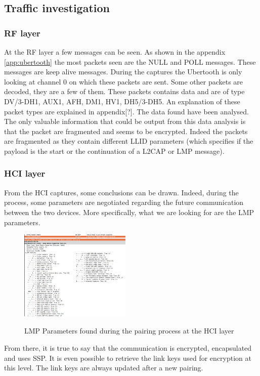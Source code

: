 \subsection{Traffic investigation}
\subsubsection{RF layer}
At the RF layer a few messages can be seen. As shown in the appendix \ref{app:ubertooth} the most packets seen are the NULL and POLL messages. These messages are keep alive messages. During the captures the Ubertooth is only looking at channel 0 on which these packets are sent.
Some other packets are decoded, they are a few of them. These packets contains data and are of type DV/3-DH1, AUX1, AFH, DM1, HV1, DH5/3-DH5. An explanation of these packet types are explained in appendix[?]. The data found have been analysed. The only valuable information that could be output from this data analysis is that the packet are fragmented and seems to be encrypted. Indeed the packets are fragmented as they contain different LLID parameters (which specifies if the payload is the start or the continuation of a L2CAP or LMP message).

\subsubsection{HCI layer}
From the HCI captures, some conclusions can be drawn. Indeed, during the process, some parameters are negotiated regarding the future communication between the two devices. More specifically, what we are looking for are the LMP parameters. 
\begin{figure}[!h]
  \begin{center}
	\includegraphics[width=200px]{images/LMP_PARAM.png}
	\label{fig:lmp}
	\caption{LMP Parameters found during the pairing process at the HCI layer}
  \end{center}
\end{figure}

From there, it is true to say that the communication is encrypted, encapsulated and uses SSP. It is even possible to retrieve the link keys used for encryption at this level. The link keys are always updated after a new pairing.


